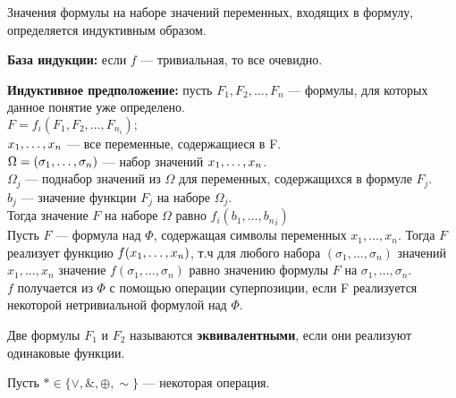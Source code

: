 Значения формулы на наборе значений переменных, входящих в формулу, определяется индуктивным образом.

\textbf{База индукции:} если $f$ --- тривиальная, то все очевидно.

\textbf{Индуктивное предположение:} пусть $F_1,F_2, \ldots, F_n$ --- формулы, для которых данное понятие уже определено. \\
$F=f_i(F_1,F_2, \ldots, {F_{n_i}});$ \\
$x_1, \ldots, x_n$ --- все переменные, содержащиеся в F. \\
$\Omega=(\sigma_1, \ldots, \sigma_n)$ --- набор значений $x_1, \ldots, x_n$. \\
$\Omega_j$ --- поднабор значений из $\Omega$ для переменных, содержащихся в формуле $F_j$. \\
$b_j$ --- значение функции $F_j$ на наборе $\Omega_j$. \\
Тогда значение $F$ на наборе $\Omega$ равно $f_i(b_1, \ldots, {b_n}_i)$ \\
Пусть $F$ --- формула над $\Phi$, содержащая символы переменных $x_1, \ldots, x_n$. Тогда $F$ реализует функцию $f(x_1, \ldots, x_n)$, т.ч для любого набора $(\sigma_1, \ldots, \sigma_n)$ значений $x_1,...,x_n$ значение $f(\sigma_1, \ldots, \sigma_n)$ равно значению формулы $F$ на $\sigma_1, \ldots, \sigma_n$. \\
$f$ получается из $\Phi$ с помощью операции суперпозиции, если F реализуется некоторой нетривиальной формулой над $\Phi$.

\begin{definition}
Две формулы $F_1$ и $F_2$ называются {\bf эквивалентными}, если они реализуют одинаковые функции.
\end{definition}

Пусть $\ast \in \{\vee, \&, \oplus, \sim \}$ --- некоторая операция.

